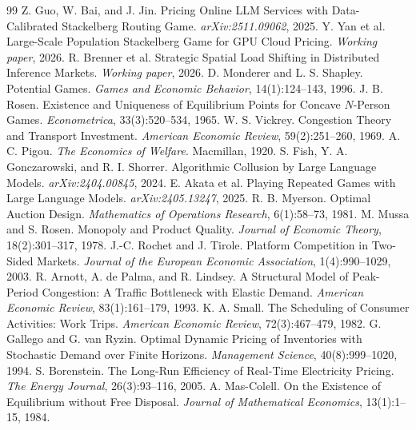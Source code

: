 \documentclass[11pt]{article}
\begin{document}
\begin{thebibliography}{99}
 Z. Guo, W. Bai, and J. Jin. Pricing Online LLM Services with Data-Calibrated Stackelberg Routing Game. \textit{arXiv:2511.09062}, 2025.
 Y. Yan et al. Large-Scale Population Stackelberg Game for GPU Cloud Pricing. \textit{Working paper}, 2026.
 R. Brenner et al. Strategic Spatial Load Shifting in Distributed Inference Markets. \textit{Working paper}, 2026.
 D. Monderer and L. S. Shapley. Potential Games. \textit{Games and Economic Behavior}, 14(1):124--143, 1996.
 J. B. Rosen. Existence and Uniqueness of Equilibrium Points for Concave $N$-Person Games. \textit{Econometrica}, 33(3):520--534, 1965.
 W. S. Vickrey. Congestion Theory and Transport Investment. \textit{American Economic Review}, 59(2):251--260, 1969.
 A. C. Pigou. \textit{The Economics of Welfare}. Macmillan, 1920.
 S. Fish, Y. A. Gonczarowski, and R. I. Shorrer. Algorithmic Collusion by Large Language Models. \textit{arXiv:2404.00845}, 2024.
 E. Akata et al. Playing Repeated Games with Large Language Models. \textit{arXiv:2405.13247}, 2025.
 R. B. Myerson. Optimal Auction Design. \textit{Mathematics of Operations Research}, 6(1):58--73, 1981.
 M. Mussa and S. Rosen. Monopoly and Product Quality. \textit{Journal of Economic Theory}, 18(2):301--317, 1978.
 J.-C. Rochet and J. Tirole. Platform Competition in Two-Sided Markets. \textit{Journal of the European Economic Association}, 1(4):990--1029, 2003.
 R. Arnott, A. de Palma, and R. Lindsey. A Structural Model of Peak-Period Congestion: A Traffic Bottleneck with Elastic Demand. \textit{American Economic Review}, 83(1):161--179, 1993.
 K. A. Small. The Scheduling of Consumer Activities: Work Trips. \textit{American Economic Review}, 72(3):467--479, 1982.
 G. Gallego and G. van Ryzin. Optimal Dynamic Pricing of Inventories with Stochastic Demand over Finite Horizons. \textit{Management Science}, 40(8):999--1020, 1994.
 S. Borenstein. The Long-Run Efficiency of Real-Time Electricity Pricing. \textit{The Energy Journal}, 26(3):93--116, 2005.
 A. Mas-Colell. On the Existence of Equilibrium without Free Disposal. \textit{Journal of Mathematical Economics}, 13(1):1--15, 1984.
\end{thebibliography}
\end{document}
